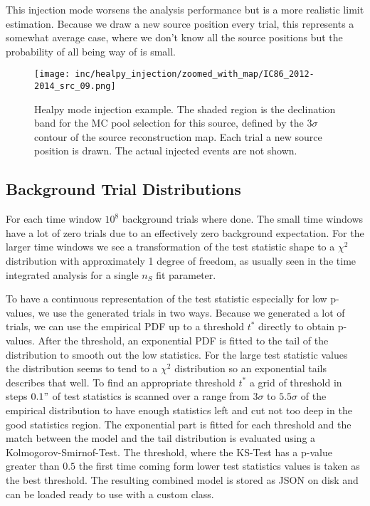 This injection mode worsens the analysis performance but is a more realistic limit estimation.
Because we draw a new source position every trial, this represents a somewhat average case, where we don't know all the source positions but the probability of all being way of is small.
\begin{figure}[htbp]
  \centering
  \texttt{[image: inc/healpy\_injection/zoomed\_with\_map/IC86\_2012-2014\_src\_09.png]}
  \caption{Healpy mode injection example. The shaded region is the declination band for the MC pool selection for this source, defined by the $3\sigma$ contour of the source reconstruction map. Each trial a new source position is drawn. The actual injected events are not shown.}
  \label{fig:healpy_injection}
\end{figure}

\subsection{Background Trial Distributions}
For each time window $10^8$ background trials where done.
The small time windows have a lot of zero trials due to an effectively zero background expectation.
For the larger time windows we see a transformation of the test statistic shape to a $\chi^2$ distribution with approximately 1 degree of freedom, as usually seen in the time integrated analysis for a single $n_S$ fit parameter.

To have a continuous representation of the test statistic especially for low p-values, we use the generated trials in two ways.
Because we generated a lot of trials, we can use the empirical PDF up to a threshold $t^*$ directly to obtain p-values.
After the threshold, an exponential PDF is fitted to the tail of the distribution to smooth out the low statistics.
For the large test statistic values the distribution seems to tend to a $\chi^2$ distribution so an exponential tails describes that well.
To find an appropriate threshold $t^*$ a grid of threshold in steps $0.1"$ of test statistics is scanned over a range from $3\sigma$ to $5.5\sigma$ of the empirical distribution to have enough statistics left and cut not too deep in the good statistics region.
The exponential part is fitted for each threshold and the match between the model and the tail distribution is evaluated using a Kolmogorov-Smirnof-Test.
The threshold, where the KS-Test has a p-value greater than $0.5$ the first time coming form lower test statistics values is taken as the best threshold.
The resulting combined model is stored as JSON on disk and can be loaded ready to use with a custom class.

